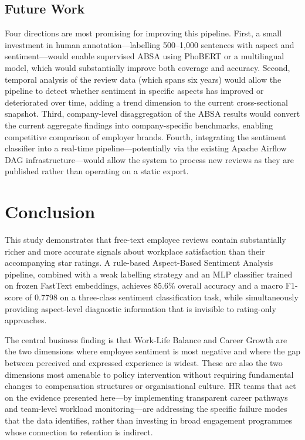 \documentclass[12pt, a4paper]{article}
\begin{document}
\subsection{Future Work}

Four directions are most promising for improving this pipeline. First, a small investment in human annotation---labelling 500--1,000 sentences with aspect and sentiment---would enable supervised ABSA using PhoBERT or a multilingual model, which would substantially improve both coverage and accuracy. Second, temporal analysis of the review data (which spans six years) would allow the pipeline to detect whether sentiment in specific aspects has improved or deteriorated over time, adding a trend dimension to the current cross-sectional snapshot. Third, company-level disaggregation of the ABSA results would convert the current aggregate findings into company-specific benchmarks, enabling competitive comparison of employer brands. Fourth, integrating the sentiment classifier into a real-time pipeline---potentially via the existing Apache Airflow DAG infrastructure---would allow the system to process new reviews as they are published rather than operating on a static export.

\section{Conclusion}

This study demonstrates that free-text employee reviews contain substantially richer and more accurate signals about workplace satisfaction than their accompanying star ratings. A rule-based Aspect-Based Sentiment Analysis pipeline, combined with a weak labelling strategy and an MLP classifier trained on frozen FastText embeddings, achieves 85.6\% overall accuracy and a macro F1-score of 0.7798 on a three-class sentiment classification task, while simultaneously providing aspect-level diagnostic information that is invisible to rating-only approaches.

The central business finding is that Work-Life Balance and Career Growth are the two dimensions where employee sentiment is most negative and where the gap between perceived and expressed experience is widest. These are also the two dimensions most amenable to policy intervention without requiring fundamental changes to compensation structures or organisational culture. HR teams that act on the evidence presented here---by implementing transparent career pathways and team-level workload monitoring---are addressing the specific failure modes that the data identifies, rather than investing in broad engagement programmes whose connection to retention is indirect.
\end{document}
